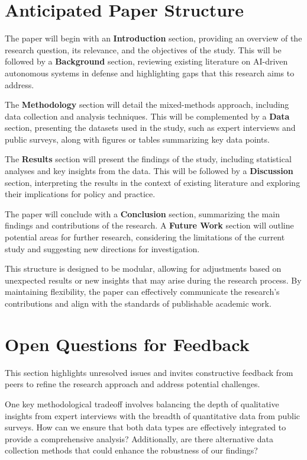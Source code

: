 \documentclass{article} %
\begin{document}
\section{Anticipated Paper Structure}
\label{sec:structure}

The paper will begin with an \textbf{Introduction} section, providing an overview of the research question, its relevance, and the objectives of the study. This will be followed by a \textbf{Background} section, reviewing existing literature on AI-driven autonomous systems in defense and highlighting gaps that this research aims to address.

The \textbf{Methodology} section will detail the mixed-methods approach, including data collection and analysis techniques. This will be complemented by a \textbf{Data} section, presenting the datasets used in the study, such as expert interviews and public surveys, along with figures or tables summarizing key data points.

The \textbf{Results} section will present the findings of the study, including statistical analyses and key insights from the data. This will be followed by a \textbf{Discussion} section, interpreting the results in the context of existing literature and exploring their implications for policy and practice.

The paper will conclude with a \textbf{Conclusion} section, summarizing the main findings and contributions of the research. A \textbf{Future Work} section will outline potential areas for further research, considering the limitations of the current study and suggesting new directions for investigation.

This structure is designed to be modular, allowing for adjustments based on unexpected results or new insights that may arise during the research process. By maintaining flexibility, the paper can effectively communicate the research's contributions and align with the standards of publishable academic work.

\section{Open Questions for Feedback}
\label{sec:questions}

This section highlights unresolved issues and invites constructive feedback from peers to refine the research approach and address potential challenges.

One key methodological tradeoff involves balancing the depth of qualitative insights from expert interviews with the breadth of quantitative data from public surveys. How can we ensure that both data types are effectively integrated to provide a comprehensive analysis? Additionally, are there alternative data collection methods that could enhance the robustness of our findings?
\end{document}
